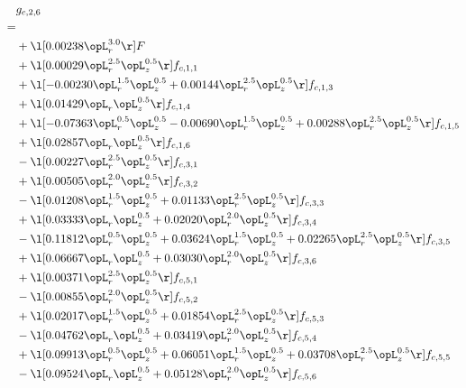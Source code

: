 \begin{alignat}{2} 
\label{eq:g_26_0} 
& g_{c,2,6} \nonumber \\ 
 = \\ 
& + \l[  0.00238 \opL_r^{3.0}  \r] F \nonumber \\ 
& + \l[  0.00029 \opL_r^{2.5} \opL_z^{0.5}  \r] f_{c,1,1} \nonumber \\ 
& + \l[  -0.00230 \opL_r^{1.5} \opL_z^{0.5} +  0.00144 \opL_r^{2.5} \opL_z^{0.5}  \r] f_{c,1,3} \nonumber \\ 
& + \l[  0.01429 \opL_r \opL_z^{0.5}  \r] f_{c,1,4} \nonumber \\ 
& + \l[  -0.07363 \opL_r^{0.5} \opL_z^{0.5}   -0.00690 \opL_r^{1.5} \opL_z^{0.5} +  0.00288 \opL_r^{2.5} \opL_z^{0.5}  \r] f_{c,1,5} \nonumber \\ 
& + \l[  0.02857 \opL_r \opL_z^{0.5}  \r] f_{c,1,6} \nonumber \\ 
& - \l[  0.00227 \opL_r^{2.5} \opL_z^{0.5}  \r] f_{c,3,1} \nonumber \\ 
& + \l[  0.00505 \opL_r^{2.0} \opL_z^{0.5}  \r] f_{c,3,2} \nonumber \\ 
& - \l[  0.01208 \opL_r^{1.5} \opL_z^{0.5} +  0.01133 \opL_r^{2.5} \opL_z^{0.5}  \r] f_{c,3,3} \nonumber \\ 
& + \l[  0.03333 \opL_r \opL_z^{0.5} +  0.02020 \opL_r^{2.0} \opL_z^{0.5}  \r] f_{c,3,4} \nonumber \\ 
& - \l[  0.11812 \opL_r^{0.5} \opL_z^{0.5} +  0.03624 \opL_r^{1.5} \opL_z^{0.5} +  0.02265 \opL_r^{2.5} \opL_z^{0.5}  \r] f_{c,3,5} \nonumber \\ 
& + \l[  0.06667 \opL_r \opL_z^{0.5} +  0.03030 \opL_r^{2.0} \opL_z^{0.5}  \r] f_{c,3,6} \nonumber \\ 
& + \l[  0.00371 \opL_r^{2.5} \opL_z^{0.5}  \r] f_{c,5,1} \nonumber \\ 
& - \l[  0.00855 \opL_r^{2.0} \opL_z^{0.5}  \r] f_{c,5,2} \nonumber \\ 
& + \l[  0.02017 \opL_r^{1.5} \opL_z^{0.5} +  0.01854 \opL_r^{2.5} \opL_z^{0.5}  \r] f_{c,5,3} \nonumber \\ 
& - \l[  0.04762 \opL_r \opL_z^{0.5} +  0.03419 \opL_r^{2.0} \opL_z^{0.5}  \r] f_{c,5,4} \nonumber \\ 
& + \l[  0.09913 \opL_r^{0.5} \opL_z^{0.5} +  0.06051 \opL_r^{1.5} \opL_z^{0.5} +  0.03708 \opL_r^{2.5} \opL_z^{0.5}  \r] f_{c,5,5} \nonumber \\ 
& - \l[  0.09524 \opL_r \opL_z^{0.5} +  0.05128 \opL_r^{2.0} \opL_z^{0.5}  \r] f_{c,5,6} \nonumber \\ 
\end{alignat} 


